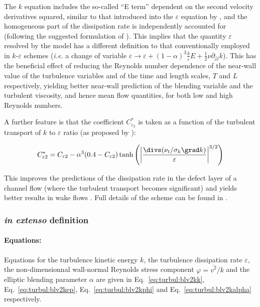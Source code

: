 The $k$ equation includes the so-called ``E term'' dependent on the second velocity 
derivatives squared, similar to that introduced into the $\varepsilon$ equation 
by \cite{Jones:1972}, and the homogeneous part of the dissipation rate is 
independently accounted for (following the suggested formulation of \cite{Jakirlic:2002}). 
This implies that the quantity $\varepsilon$ resolved by the model has a different definition 
to that conventionally employed in $k$-$\varepsilon$ schemes (\emph{i.e.} a change of 
variable $\varepsilon \to \varepsilon + (1-\alpha)^3\frac{k}{\varepsilon}E+\frac{1}{2}\nu\partial_{jj}k$). 
This has the beneficial effect of reducing the Reynolds number dependence of the near-wall 
value of the turbulence variables and of the time and length scales, $T$ and $L$ respectively, 
yielding better near-wall prediction of the blending variable and the turbulent viscosity, 
and hence mean flow quantities, for both low and high Reynolds numbers. 
 
A further feature is that the coefficient $C_{\varepsilon_2}^*$ is taken as a function 
of the turbulent transport of $k$ to $\varepsilon$ ratio  (as proposed by \cite{parneix1996second}):

\begin{equation}
  C_{\varepsilon 2}^* = C_{\varepsilon 2} 
- \alpha^3 (0.4-C_{\varepsilon 2}) \tanh \left( \left|  \frac{\divs (\nu_t / \sigma_k \grad k)}{\varepsilon}   \right| ^{3/2}  \right)
\end{equation}

This improves the predictions of the dissipation rate in the defect layer of a channel flow (where the turbulent transport becomes significant) and yields better results in wake flows \cite{parneix1996second}. Full details of the scheme can be found in \cite{Billard:2012}.

\subsubsection{\emph{in extenso} definition}

\paragraph{Equations:}
Equations for the turbulence kinetic energy $k$, the turbulence dissipation rate $\varepsilon$, 
the non-dimensionnal wall-normal Reynolds stress component $\varphi=\overline{v^2}/k$ and 
the elliptic blending parameter $\alpha$ are given in Eq.~\eqref{eq:turbul:blv2kk}, 
Eq.~\eqref{eq:turbul:blv2kep},  Eq.~\eqref{eq:turbul:blv2kphi} and Eq.~\eqref{eq:turbul:blv2kalpha} respectively. 

